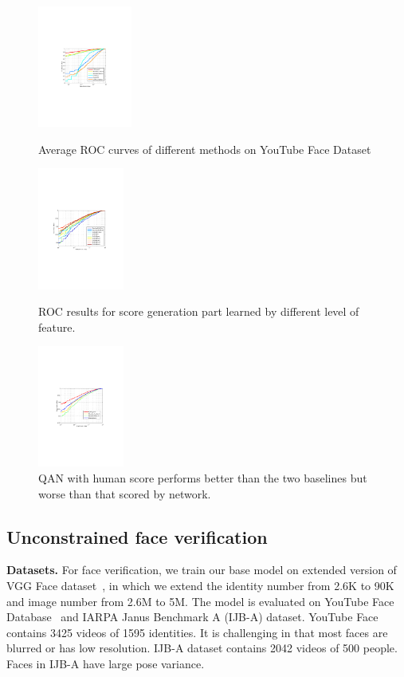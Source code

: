 \begin{figure}[!htb]
\center
  \includegraphics[height=4cm]{rocs.pdf}
  \caption{Average ROC curves of different methods on YouTube Face Dataset}
  \label{fig:rocs}
\endminipage\hfill
{}%
\center
  \includegraphics[height=4cm]{rocs_youtube_qanloc.pdf}
  \caption{ROC results for score generation part learned by different level of feature.}
  \label{fig:qanloc}
\endminipage
{}
\centering
  \includegraphics[height=4cm]{n4321-ok.pdf}
  \caption{QAN with human score performs better than the two baselines but worse than that scored by network.\label{fig:roc4321}}
\endminipage


\end{figure}

\subsection{Unconstrained face verification}
\textbf{Datasets.} For face verification, we train our base model on extended version of VGG Face dataset~\cite{Parkhi15}, in which we extend the identity number from 2.6K to 90K and image number from 2.6M to 5M. The model is evaluated on YouTube Face Database~\cite{wolf2011face} and IARPA Janus Benchmark A (IJB-A) dataset. YouTube Face contains 3425 videos of 1595 identities. It is challenging in that most faces are blurred or has low resolution. IJB-A dataset contains 2042 videos of 500 people. Faces in IJB-A have large pose variance.

